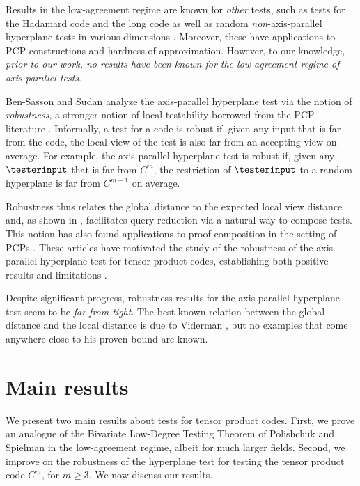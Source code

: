 \documentclass{toc}
\theoremstyle{plain}
\begin{document}
Results in the low-agreement regime are known for \emph{other} tests, such as tests for the Hadamard code \cite{BellareCHKS96} and the long code \cite{Hastad01} as well as random \emph{non}-axis-parallel hyperplane tests in various dimensions \cite{RazS97,AroraS03,MoshkovitzR08-ldt}. Moreover, these have applications to PCP constructions and hardness of approximation. However, to our knowledge,
%
\emph{prior to our work, no results %
have been  %
known for the low-agreement regime of axis-parallel tests}.

Ben-Sasson and Sudan \cite{Ben-SassonS06} analyze the axis-parallel hyperplane test via the notion of \emph{robustness}, a stronger notion of local testability borrowed from the PCP literature \cite{BenSassonGHSV06,DinurR04}. Informally, a test for a code is robust if, given any input that is far from the code, the local view of the test is also far from an accepting view on average. For example, the axis-parallel hyperplane test is robust if, given any $\testerinput$ that is far from $C^{m}$, the restriction of $\testerinput$ to a random hyperplane is far from $C^{m-1}$ on average.

Robustness thus relates the global distance to the expected local view distance and, as shown in \cite{Ben-SassonS06}, facilitates query reduction via a natural way to compose
%
tests.  This notion   %
has also found applications to proof composition in the setting of PCPs \cite{BenSassonGHSV06}.
%
These articles have %
motivated the study of the robustness of the axis-parallel hyperplane test for tensor product codes, establishing both positive results \cite{DinurSW06,BenSassonV08,BenSassonV15,Viderman12} and limitations \cite{Valiant05,CoppersmithR05,GoldreichM12}.

Despite significant progress, robustness results for the axis-parallel hyperplane test seem to be \emph{far from tight}. The best known relation between the global distance and the local distance is due to Viderman \cite{Viderman12}, but no examples that come anywhere close to his proven bound are known.


%
%
%
\section{Main results}
\label{sec:our-results}

We present two main results about tests for tensor product codes. First, we prove an analogue of the Bivariate Low-Degree Testing Theorem of Polishchuk and Spielman \cite{PolishchukS94} in the low-agreement regime, albeit
%
for much larger fields.   %
Second, we improve on the robustness of the hyperplane test for testing the tensor product code $C^{m}$, for $m \geq 3$. We now discuss our results.
\end{document}
